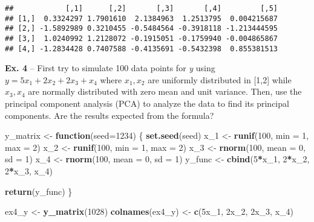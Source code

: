 \documentclass[
]{article}
\newenvironment{Shaded}{\begin{snugshade}}{\end{snugshade}}
\newcommand{\ControlFlowTok}[1]{\textcolor[rgb]{0.13,0.29,0.53}{\textbf{#1}}}
\newcommand{\DataTypeTok}[1]{\textcolor[rgb]{0.13,0.29,0.53}{#1}}
\newcommand{\DecValTok}[1]{\textcolor[rgb]{0.00,0.00,0.81}{#1}}
\newcommand{\KeywordTok}[1]{\textcolor[rgb]{0.13,0.29,0.53}{\textbf{#1}}}
\newcommand{\NormalTok}[1]{#1}
\newcommand{\OperatorTok}[1]{\textcolor[rgb]{0.81,0.36,0.00}{\textbf{#1}}}
\newcommand{\StringTok}[1]{\textcolor[rgb]{0.31,0.60,0.02}{#1}}
\begin{document}
\begin{verbatim}
##            [,1]      [,2]       [,3]       [,4]         [,5]
## [1,]  0.3324297 1.7901610  2.1384963  1.2513795  0.004215687
## [2,] -1.5892989 0.3210455 -0.5484564 -0.3918118 -1.213444595
## [3,]  1.0240992 1.2128072 -0.1915051 -0.1759940 -0.004865867
## [4,] -1.2834428 0.7407588 -0.4135691 -0.5432398  0.855381513
\end{verbatim}

\textbf{Ex. 4} -- First try to simulate 100 data points for \emph{y}
using \(y = 5x_1 + 2x_2 + 2x_3 + x_4\) where \(x_1, x_2\) are uniformly
distributed in {[}1,2{]} while \(x_3, x_4\) are normally distributed
with zero mean and unit variance. Then, use the principal component
analysis (PCA) to analyze the data to find its principal components. Are
the results expected from the formula?

\begin{Shaded}
\begin{Highlighting}[]
\NormalTok{y\_matrix \textless{}{-}}\StringTok{ }\ControlFlowTok{function}\NormalTok{(}\DataTypeTok{seed=}\DecValTok{1234}\NormalTok{) \{}
  \KeywordTok{set.seed}\NormalTok{(seed)}
\NormalTok{  x\_}\DecValTok{1}\NormalTok{ \textless{}{-}}\StringTok{ }\KeywordTok{runif}\NormalTok{(}\DecValTok{100}\NormalTok{, }\DataTypeTok{min =} \DecValTok{1}\NormalTok{, }\DataTypeTok{max =} \DecValTok{2}\NormalTok{)}
\NormalTok{  x\_}\DecValTok{2}\NormalTok{ \textless{}{-}}\StringTok{ }\KeywordTok{runif}\NormalTok{(}\DecValTok{100}\NormalTok{, }\DataTypeTok{min =} \DecValTok{1}\NormalTok{, }\DataTypeTok{max =} \DecValTok{2}\NormalTok{)}
\NormalTok{  x\_}\DecValTok{3}\NormalTok{ \textless{}{-}}\StringTok{ }\KeywordTok{rnorm}\NormalTok{(}\DecValTok{100}\NormalTok{, }\DataTypeTok{mean =} \DecValTok{0}\NormalTok{, }\DataTypeTok{sd =} \DecValTok{1}\NormalTok{)}
\NormalTok{  x\_}\DecValTok{4}\NormalTok{ \textless{}{-}}\StringTok{ }\KeywordTok{rnorm}\NormalTok{(}\DecValTok{100}\NormalTok{, }\DataTypeTok{mean =} \DecValTok{0}\NormalTok{, }\DataTypeTok{sd =} \DecValTok{1}\NormalTok{)}
\NormalTok{  y\_func \textless{}{-}}\StringTok{ }\KeywordTok{cbind}\NormalTok{(}\DecValTok{5}\OperatorTok{*}\NormalTok{x\_}\DecValTok{1}\NormalTok{, }\DecValTok{2}\OperatorTok{*}\NormalTok{x\_}\DecValTok{2}\NormalTok{, }\DecValTok{2}\OperatorTok{*}\NormalTok{x\_}\DecValTok{3}\NormalTok{, x\_}\DecValTok{4}\NormalTok{)}

  \KeywordTok{return}\NormalTok{(y\_func)}
\NormalTok{\}}

\NormalTok{ex4\_y \textless{}{-}}\StringTok{ }\KeywordTok{y\_matrix}\NormalTok{(}\DecValTok{1028}\NormalTok{)}
\KeywordTok{colnames}\NormalTok{(ex4\_y) \textless{}{-}}\StringTok{ }\KeywordTok{c}\NormalTok{(}\StringTok{\textquotesingle{}5x\_1\textquotesingle{}}\NormalTok{, }\StringTok{\textquotesingle{}2x\_2\textquotesingle{}}\NormalTok{, }\StringTok{\textquotesingle{}2x\_3\textquotesingle{}}\NormalTok{, }\StringTok{\textquotesingle{}x\_4\textquotesingle{}}\NormalTok{)}
\end{Highlighting}
\end{Shaded}
\end{document}
